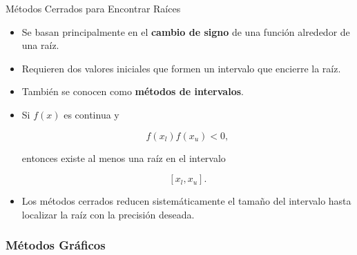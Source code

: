 \documentclass[../../main.tex]{subfiles}
\begin{document}
\begin{frame}{Métodos Cerrados para Encontrar Raíces}

\begin{itemize}

    \item Se basan principalmente en el \textbf{cambio de signo} de una función alrededor de una raíz.

    \item Requieren dos valores iniciales que formen un intervalo que encierre la raíz.

    \item También se conocen como \textbf{métodos de intervalos}.

    \item Si \(f(x)\) es continua y

    \[
    f(x_l)f(x_u)<0,
    \]

    entonces existe al menos una raíz en el intervalo

    \[
    [x_l,x_u].
    \]

    \item Los métodos cerrados reducen sistemáticamente el tamaño del intervalo hasta localizar la raíz con la precisión deseada.

\end{itemize}

\end{frame}



\subsubsection{Métodos Gráficos}
\end{document}
